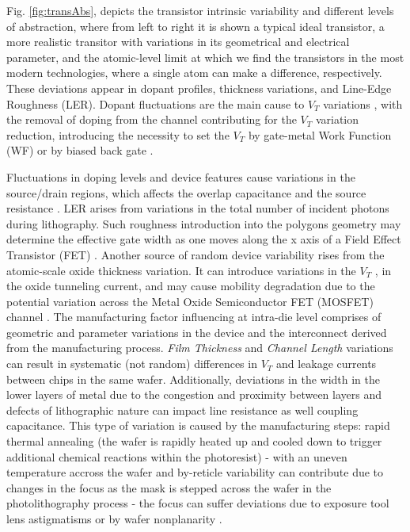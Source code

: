 \documentclass[pgmicro,diss,english]{iiufrgs}
\begin{document}
\begin{itemize}
Fig. \ref{fig:transAbs}, depicts the transistor intrinsic variability and different levels of abstraction, where from left to right it is shown a typical ideal transistor, a more realistic transitor with variations in its geometrical and electrical parameter, and the atomic-level limit at which we find the transistors in the most modern technologies, where a single atom can make a difference, respectively. These deviations appear in dopant profiles, thickness variations, and Line-Edge Roughness (LER). Dopant fluctuations are the main cause to $V_T$ variations \cite{asenov2003simulation}, with the removal of doping from the channel contributing for the $V_T$ variation reduction, introducing the necessity to set the $V_T$ by gate-metal Work Function (WF) or by biased back gate \cite{frank2001device,wong1999nanoscale}.

Fluctuations in doping levels and device features cause variations in the source/drain regions, which affects the overlap capacitance and the source resistance \cite{frank2000simulation}. LER arises from variations in the total number of incident photons during lithography. Such roughness introduction into the polygons geometry may determine the effective gate width as one moves along the x axis of a Field Effect Transistor (FET) \cite{brunner2003optical}. Another source of random device variability rises from the atomic-scale oxide thickness variation. It can introduce variations in the $V_T$ \cite{asenov2003simulation}, in the oxide tunneling current, and may cause mobility degradation due to the potential variation across the Metal Oxide Semiconductor FET (MOSFET) channel \cite{bernstein2006high}.
The manufacturing factor influencing at intra-die level comprises of geometric and parameter variations in the device and the interconnect derived from the manufacturing process. \textit{Film Thickness} and \textit{Channel Length} variations can result in systematic (not random) differences in $V_T$ and leakage currents between chips in the same wafer. Additionally, deviations in the width in the lower layers of metal due to the congestion and proximity between layers and defects of lithographic nature can impact line resistance as well coupling capacitance. This type of variation is caused by the manufacturing steps: rapid thermal annealing (the wafer is rapidly heated up and cooled down to trigger additional chemical reactions within the photoresist) - with an uneven temperature accross the wafer and by-reticle variability can contribute due to changes in the focus as the mask is stepped across the wafer in the photolithography process - the focus can suffer deviations due to exposure tool lens astigmatisms or by wafer nonplanarity \cite{bernstein2006high, qian2015variability}.

\end{itemize}
\end{document}
